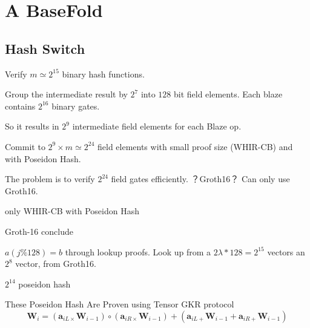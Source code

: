 \section{A BaseFold}


\subsection{Hash Switch}

Verify $m \simeq 2^{15}$ binary hash functions.

Group the intermediate result by $2^{7}$ into $128$ bit field elements.
Each blaze contains $2^{16}$ binary gates.

So it results in $2^{9}$ intermediate field elements for each Blaze op.

Commit to $2^9 \times m \simeq 2^{24}$ field elements with small proof size (WHIR-CB) and with Poseidon Hash.

The problem is to verify $2^{24}$ field gates efficiently.
？Groth16？
Can only use Groth16.

only WHIR-CB with Poseidon Hash

Groth-16 conclude

$a   (j \% 128) = b$ through lookup proofs.
Look up from a $2\lambda * 128 = 2^{15}$ vectors
an $2^8$ vector,
from Groth16.

$2^{14}$ poseidon hash 

These Poseidon Hash Are Proven using Tensor GKR protocol
\[
    \bm{W}_i = 
    (\bm{a}_{iL\times} \bm{W}_{i-1}) \circ
    (\bm{a}_{iR\times} \bm{W}_{i-1})
    + (\bm{a}_{iL+} \bm{W}_{i-1} + \bm{a}_{iR+} \bm{W}_{i-1})
\]
